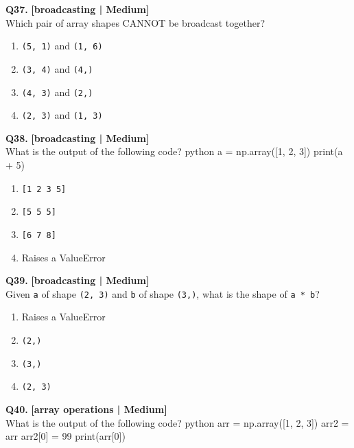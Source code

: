 \noindent\textbf{Q37.} \hfill {\small\color{LPUOrange}\textbf{[broadcasting | Medium]}}\\[2pt]
Which pair of array shapes CANNOT be broadcast together?

\begin{enumerate}[label=(\alph*),topsep=2pt,itemsep=1pt,partopsep=0pt,parsep=0pt]
    \item \relax \texttt{(5, 1)} and \texttt{(1, 6)}
    \item \relax \texttt{(3, 4)} and \texttt{(4,)}
    \item \relax \texttt{(4, 3)} and \texttt{(2,)}
    \item \relax \texttt{(2, 3)} and \texttt{(1, 3)}
\end{enumerate}
\vspace{2mm}

\noindent\textbf{Q38.} \hfill {\small\color{LPUOrange}\textbf{[broadcasting | Medium]}}\\[2pt]
What is the output of the following code? 
 python 
 a = np.array([1, 2, 3]) 
 print(a + 5)

\begin{enumerate}[label=(\alph*),topsep=2pt,itemsep=1pt,partopsep=0pt,parsep=0pt]
    \item \relax \texttt{[1 2 3 5]}
    \item \relax \texttt{[5 5 5]}
    \item \relax \texttt{[6 7 8]}
    \item \relax Raises a ValueError
\end{enumerate}
\vspace{2mm}

\noindent\textbf{Q39.} \hfill {\small\color{LPUOrange}\textbf{[broadcasting | Medium]}}\\[2pt]
Given \texttt{a} of shape \texttt{(2, 3)} and \texttt{b} of shape \texttt{(3,)}, what is the shape of \texttt{a * b}?

\begin{enumerate}[label=(\alph*),topsep=2pt,itemsep=1pt,partopsep=0pt,parsep=0pt]
    \item \relax Raises a ValueError
    \item \relax \texttt{(2,)}
    \item \relax \texttt{(3,)}
    \item \relax \texttt{(2, 3)}
\end{enumerate}
\vspace{2mm}

\noindent\textbf{Q40.} \hfill {\small\color{LPUOrange}\textbf{[array operations | Medium]}}\\[2pt]
What is the output of the following code? 
 python 
 arr = np.array([1, 2, 3]) 
 arr2 = arr 
 arr2[0] = 99 
 print(arr[0])

